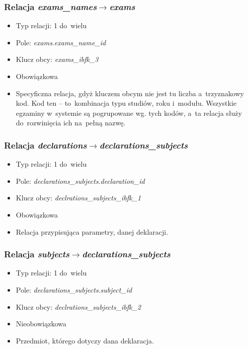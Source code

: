 \documentclass[a4paper,12pt,oneside]{report}
\begin{document}
\subsubsection{Relacja \emph{exams\_names}$\to$\emph{exams}}
\label{subsub:exams_names-exams}
\begin{itemize}
  \item Typ relacji: 1 do~wielu
  \item Pole: \emph{exams}.\emph{exams\_name\_id}
  \item Klucz obcy: \emph{exams\_ibfk\_3}
  \item Obowiązkowa
  \item Specyficzna relacja, gdyż kluczem obcym nie jest tu liczba a~trzyznakowy kod. Kod ten -- to~kombinacja typu studiów, roku i~modułu. Wszystkie egzaminy w~systemie są pogrupowane wg. tych kodów, a~ta relacja służy do~rozwinięcia ich na~pełną nazwę.
\end{itemize}

\subsubsection{Relacja \emph{declarations}$\to$\emph{declarations\_subjects}}
\label{subsub:declarations-declarations_subjects}
\begin{itemize}
  \item Typ relacji: 1 do~wielu
  \item Pole: \emph{declarations\_subjects}.\emph{declaration\_id}
  \item Klucz obcy: \emph{declrations\_subjects\_ibfk\_1}
  \item Obowiązkowa
  \item Relacja przypisująca parametry, danej deklaracji.
\end{itemize}

\subsubsection{Relacja \emph{subjects}$\to$\emph{declarations\_subjects}}
\label{subsub:subjects-declarations_subjects}
\begin{itemize}
  \item Typ relacji: 1 do~wielu
  \item Pole: \emph{declarations\_subjects}.\emph{subject\_id}
  \item Klucz obcy: \emph{declrations\_subjects\_ibfk\_2}
  \item Nieobowiązkowa
  \item Przedmiot, którego dotyczy dana deklaracja.
\end{itemize}
\end{document}
